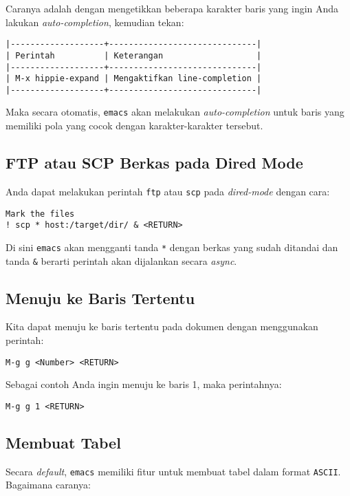 \documentclass{article}
\begin{document}
Caranya adalah dengan mengetikkan beberapa karakter baris yang ingin Anda 
lakukan \emph{auto-completion}, kemudian tekan:

\begin{verbatim}
|-------------------+------------------------------|
| Perintah          | Keterangan                   |
|-------------------+------------------------------|
| M-x hippie-expand | Mengaktifkan line-completion |
|-------------------+------------------------------|
\end{verbatim}

Maka secara otomatis, \verb=emacs= akan melakukan \emph{auto-completion}
untuk baris yang memiliki pola yang cocok dengan karakter-karakter tersebut.


\subsection{FTP atau SCP Berkas pada Dired Mode}
Anda dapat melakukan perintah \verb=ftp= atau \verb=scp= pada \emph{dired-mode}
dengan cara:

\begin{verbatim}
Mark the files
! scp * host:/target/dir/ & <RETURN>
\end{verbatim}

Di sini \verb=emacs= akan mengganti tanda \verb=*= dengan berkas yang sudah
ditandai dan tanda \verb=&= berarti perintah akan dijalankan secara 
\emph{async}.

\subsection{Menuju ke Baris Tertentu}
Kita dapat menuju ke baris tertentu pada dokumen dengan menggunakan perintah:

\begin{verbatim}
M-g g <Number> <RETURN>
\end{verbatim}

Sebagai contoh Anda ingin menuju ke baris 1, maka perintahnya:

\begin{verbatim}
M-g g 1 <RETURN>
\end{verbatim}

\subsection{Membuat Tabel}
Secara \emph{default}, \verb=emacs= memiliki fitur untuk membuat tabel dalam
format \verb=ASCII=. Bagaimana caranya:
\end{document}

